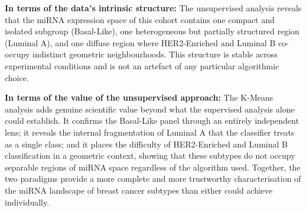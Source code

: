 \textbf{In terms of the data's intrinsic structure:} The unsupervised analysis reveals
that the miRNA expression space of this cohort contains one compact and isolated
subgroup (Basal-Like), one heterogeneous but partially structured region (Luminal A),
and one diffuse region where HER2-Enriched and Luminal B co-occupy indistinct
geometric neighbourhoods. This structure is stable across experimental conditions and
is not an artefact of any particular algorithmic choice.

\textbf{In terms of the value of the unsupervised approach:} The K-Means analysis adds
genuine scientific value beyond what the supervised analysis alone could establish. It
confirms the Basal-Like panel through an entirely independent lens; it reveals the
internal fragmentation of Luminal A that the classifier treats as a single class; and
it places the difficulty of HER2-Enriched and Luminal B classification in a geometric
context, showing that these subtypes do not occupy separable regions of miRNA space
regardless of the algorithm used. Together, the two paradigms provide a more complete
and more trustworthy characterisation of the miRNA landscape of breast cancer subtypes
than either could achieve individually.
\FloatBarrier